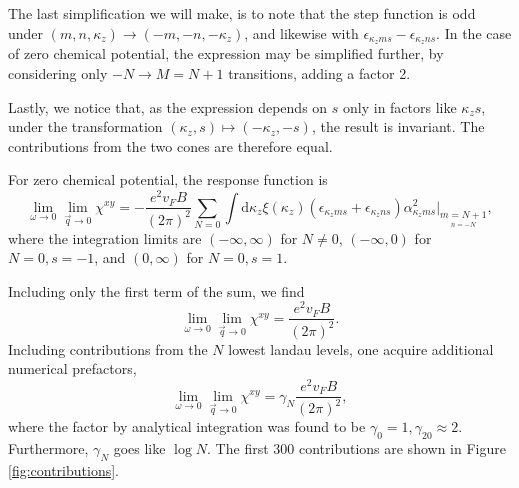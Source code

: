 The last simplification we will make, is to note that the step function is odd under \( (m, n, \kappa_z) \to (-m, -n, -\kappa_z) \), and likewise with \( \epsilon_{\kappa_z m s} - \epsilon_{\kappa_z n s} \).
In the case of zero chemical potential, the expression may be simplified further, by considering only \( -N \to M = N + 1\) transitions, adding a factor 2.

Lastly, we notice that, as the expression depends on \( s \) only in factors like \( \kappa_z s \), under the transformation \( (\kappa_z, s) \mapsto (-\kappa_z, -s) \), the result is invariant.
The contributions from the two cones are therefore equal.

For zero chemical potential, the response function is
\begin{equation}
  \label{eq:63}
  \lim_{\omega \to 0} \lim_{\vec{q} \to 0} \chi^{xy} =
  -\frac{e^2 v_F B}{(2 \pi)^2}
  \sum\limits_{N=0} \int \mathrm{d}\kappa_z
  \xi(\kappa_z) (\epsilon_{\kappa_z m s} + \epsilon_{\kappa_z n s})
  \alpha_{\kappa_z m s}^2
  \big|_{\underset{n=-N}{m=N+1}},
\end{equation}
where the integration limits are \( (-\infty, \infty) \) for \( N \neq 0 \), \( (-\infty, 0) \) for \( N = 0, s=-1 \), and \( (0, \infty) \) for \( N=0, s=1 \).

Including only the first term of the sum, we find
\begin{equation}
  \label{eq:64}
  \lim_{\omega \to 0} \lim_{\vec{q} \to 0} \chi^{xy} = \frac{e^2 v_F B}{(2 \pi)^2}.
\end{equation}
Including contributions from the \( N \) lowest landau levels, one acquire additional numerical prefactors,
\begin{equation}
  \label{eq:65}
  \lim_{\omega \to 0} \lim_{\vec{q} \to 0} \chi^{xy} = \gamma_N \frac{e^2 v_F B}{(2 \pi)^2},
\end{equation}
where the factor by analytical integration was found to be \( \gamma_0 = 1, \gamma_{20} \approx 2 \).
Furthermore, \( \gamma_N \) goes like \( \log N \).
The first 300 contributions are shown in Figure \ref{fig:contributions}.

